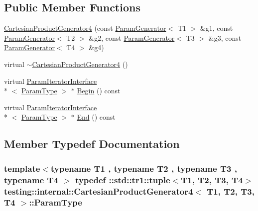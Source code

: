 \subsection*{Public Member Functions}
\begin{DoxyCompactItemize}
\item 
\hyperlink{classtesting_1_1internal_1_1CartesianProductGenerator4_a4e4512b35f0d71f7a718ded6fe829296}{Cartesian\-Product\-Generator4} (const \hyperlink{classtesting_1_1internal_1_1ParamGenerator}{Param\-Generator}$<$ T1 $>$ \&g1, const \hyperlink{classtesting_1_1internal_1_1ParamGenerator}{Param\-Generator}$<$ T2 $>$ \&g2, const \hyperlink{classtesting_1_1internal_1_1ParamGenerator}{Param\-Generator}$<$ T3 $>$ \&g3, const \hyperlink{classtesting_1_1internal_1_1ParamGenerator}{Param\-Generator}$<$ T4 $>$ \&g4)
\item 
virtual \hyperlink{classtesting_1_1internal_1_1CartesianProductGenerator4_a696ae3766915960d69b7b3d017bc2c92}{$\sim$\-Cartesian\-Product\-Generator4} ()
\item 
virtual \hyperlink{classtesting_1_1internal_1_1ParamIteratorInterface}{Param\-Iterator\-Interface}\\*
$<$ \hyperlink{classtesting_1_1internal_1_1CartesianProductGenerator4_ac8cc31e9f7b2d0b7ee725a60f82edb78}{Param\-Type} $>$ $\ast$ \hyperlink{classtesting_1_1internal_1_1CartesianProductGenerator4_ac7657bf31f1b806075d672fccb6afbd1}{Begin} () const 
\item 
virtual \hyperlink{classtesting_1_1internal_1_1ParamIteratorInterface}{Param\-Iterator\-Interface}\\*
$<$ \hyperlink{classtesting_1_1internal_1_1CartesianProductGenerator4_ac8cc31e9f7b2d0b7ee725a60f82edb78}{Param\-Type} $>$ $\ast$ \hyperlink{classtesting_1_1internal_1_1CartesianProductGenerator4_ae754e777c3d8f93578d32af2721d069b}{End} () const 
\end{DoxyCompactItemize}


\subsection{Member Typedef Documentation}
\hypertarget{classtesting_1_1internal_1_1CartesianProductGenerator4_ac8cc31e9f7b2d0b7ee725a60f82edb78}{
\subsubsection[{Param\-Type}]{\setlength{\rightskip}{0pt plus 5cm}template$<$typename T1 , typename T2 , typename T3 , typename T4 $>$ typedef \-::{\bf std\-::tr1\-::tuple}$<$T1, T2, T3, T4$>$ {\bf testing\-::internal\-::\-Cartesian\-Product\-Generator4}$<$ T1, T2, T3, T4 $>$\-::{\bf Param\-Type}}}\label{classtesting_1_1internal_1_1CartesianProductGenerator4_ac8cc31e9f7b2d0b7ee725a60f82edb78}


